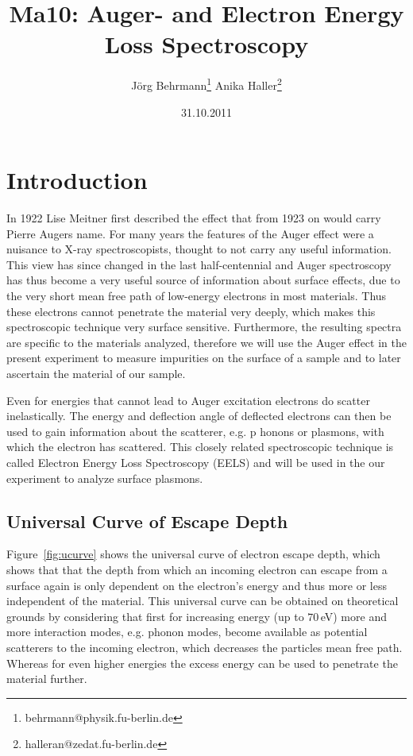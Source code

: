 \documentclass[a4paper,10pt]{scrartcl}
\begin{document}
\title{Ma10: Auger- and Electron Energy Loss Spectroscopy}
\author{J\"org Behrmann\footnote{behrmann@physik.fu-berlin.de} \qquad Anika Haller\footnote{halleran@zedat.fu-berlin.de}}
\date{31.10.2011}
\maketitle
\tableofcontents
\thispagestyle{empty}

\clearpage

\section{Introduction}

In 1922 Lise Meitner first described the effect that from 1923 on would carry Pierre Augers name. For many years the features of the Auger effect were a nuisance to X-ray spectroscopists, thought to not carry any useful information. This view has since changed in the last half-centennial and Auger spectroscopy has thus become a very useful source of information about surface effects, due to the very short mean free path of low-energy electrons in most materials. Thus these electrons cannot penetrate the material very deeply, which makes this spectroscopic technique very surface sensitive. Furthermore, the resulting spectra are specific to the materials analyzed, therefore we will use the Auger effect in the present experiment to measure impurities on the surface of a sample and to later ascertain the material of our sample.

Even for energies that cannot lead to Auger excitation electrons do scatter inelastically. The energy and deflection angle of deflected electrons can then be used to gain information about the scatterer, e.g. p
honons or plasmons, with which the electron has scattered. This closely related spectroscopic technique is called Electron Energy Loss Spectroscopy (EELS) and will be used in the our experiment to analyze surface plasmons.

\subsection{Universal Curve of Escape Depth}

Figure~\ref{fig:ucurve} shows the universal curve of electron escape depth, which shows that that the depth from which an incoming electron can escape from a surface again is only dependent on the electron's energy and thus more or less independent of the material. This universal curve can be obtained on theoretical grounds by considering that first for increasing energy (up to $70\,$eV) more and more interaction modes, e.g. phonon modes, become available as potential scatterers to the incoming electron, which decreases the particles mean free path. Whereas for even higher energies the excess energy can be used to penetrate the material further.
\end{document}
